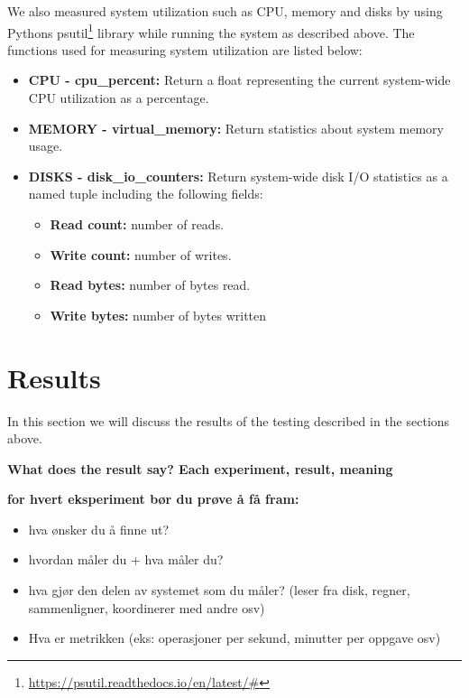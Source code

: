 \documentclass[USenglish]{uit-thesis}
\begin{document}



We also measured system utilization such as  CPU, memory and disks by using Pythons psutil\footnote{\url{https://psutil.readthedocs.io/en/latest/\#}} library while running the system as described above. 
The functions used for measuring system utilization are listed below:

\begin{itemize}
\item \textbf{CPU - cpu\_percent:} Return a float representing the current system-wide CPU utilization as a percentage.
\item \textbf{MEMORY - virtual\_memory:} Return statistics about system memory usage.
\item \textbf{DISKS - disk\_io\_counters:} Return system-wide disk I/O statistics as a named tuple including the following fields:
	\begin{itemize}
	\item \textbf{Read count:} number of reads.
	\item \textbf{Write count:} number of writes.
	\item \textbf{Read bytes:} number of bytes read.
	\item \textbf{Write bytes:} number of bytes written
	\end{itemize}
\end{itemize}



\section{Results}
In this section we will discuss the results of the testing described in the sections above.

\textbf{What does the result say? Each experiment, result, meaning}

\textbf{for hvert eksperiment bør du prøve å få fram:}
\begin{itemize}
\item hva ønsker du å finne ut? 
\item hvordan måler du + hva måler du? 
\item hva gjør den delen av systemet som du måler? (leser fra disk, regner, sammenligner, koordinerer med andre osv)
\item Hva er metrikken (eks: operasjoner per sekund, minutter per oppgave osv)
\end{itemize}
\end{document}
